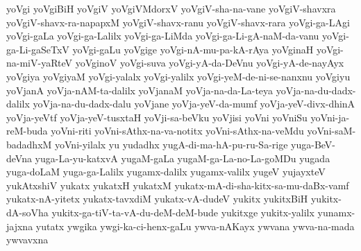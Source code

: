 {yoVgi
yoVgiBiH
yoVgiV
yoVgiVMdorxV
yoVgiV-sha-na-vane
yoVgiV-shavxra
yoVgiV-shavx-ra-napapxM
yoVgiV-shavx-ranu
yoVgiV-shavx-rara
yoVgi-ga-LAgi
yoVgi-gaLa
yoVgi-ga-Lalilx
yoVgi-ga-LiMda
yoVgi-ga-Li-gA-naM-da-vanu
yoVgi-ga-Li-gaSeTxV
yoVgi-gaLu
yoVgige
yoVgi-nA-mu-pa-kA-rAya
yoVginaH
yoVgi-na-miV-yaRteV
yoVginoV
yoVgi-suva
yoVgi-yA-da-DeVnu
yoVgi-yA-de-nayAyx
yoVgiya
yoVgiyaM
yoVgi-yalalx
yoVgi-yalilx
yoVgi-yeM-de-ni-se-nanxnu
yoVgiyu
yoVjanA
yoVja-nAM-ta-dalilx
yoVjanaM
yoVja-na-da-La-teya
yoVja-na-du-dadx-dalilx
yoVja-na-du-dadx-dalu
yoVjane
yoVja-yeV-da-mumf
yoVja-yeV-divx-dhinA
yoVja-yeVtf
yoVja-yeV-tusxtaH
yoVji-sa-beVku
yoVjisi
yoVni
yoVniSu
yoVni-ja-reM-buda
yoVni-riti
yoVni-sAthx-na-va-notitx
yoVni-sAthx-na-veMdu
yoVni-saM-badadhxM
yoVni-yilalx
yu
yudadhx
yugA-di-ma-hA-pu-ru-Sa-rige
yuga-BeV-deVna
yuga-La-yu-katxvA
yugaM-gaLa
yugaM-ga-La-no-La-goMDu
yugada
yuga-doLaM
yuga-ga-Lalilx
yugamx-dalilx
yugamx-valilx
yugeV
yujayxteV
yukAtxshiV
yukatx
yukatxH
yukatxM
yukatx-mA-di-sha-kitx-sa-mu-daBx-vamf
yukatx-nA-yitetx
yukatx-tavxdiM
yukatx-vA-dudeV
yukitx
yukitxBiH
yukitx-dA-soVha
yukitx-ga-tiV-ta-vA-du-deM-deM-bude
yukitxge
yukitx-yalilx
yunamx-jajxna
yutatx
ywgika
ywgi-ka-ci-henx-gaLu
ywva-nAKayx
ywvana
ywva-na-mada
ywvavxna
}
